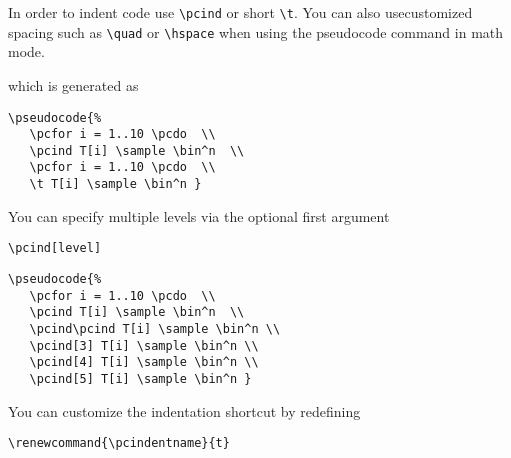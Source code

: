 \documentclass[a4paper]{report}
\begin{document}
In order to indent code use \lstinline$\pcind$ or short \lstinline$\t$. You can also usecustomized spacing such as \lstinline$\quad$ or \lstinline$\hspace$
when using the pseudocode command in math mode.
\begin{center}
\end{center}
which is generated as
\begin{lstlisting}
\pseudocode{%
   \pcfor i = 1..10 \pcdo  \\
   \pcind T[i] \sample \bin^n  \\
   \pcfor i = 1..10 \pcdo  \\
   \t T[i] \sample \bin^n }
\end{lstlisting}
You can specify multiple levels via the optional first argument
\begin{lstlisting}
\pcind[level]
\end{lstlisting}
\begin{center}
\end{center}
\begin{lstlisting}
\pseudocode{%
   \pcfor i = 1..10 \pcdo  \\
   \pcind T[i] \sample \bin^n  \\
   \pcind\pcind T[i] \sample \bin^n \\
   \pcind[3] T[i] \sample \bin^n \\
   \pcind[4] T[i] \sample \bin^n \\
   \pcind[5] T[i] \sample \bin^n }
\end{lstlisting}

You can customize the indentation shortcut by redefining
\begin{lstlisting}
\renewcommand{\pcindentname}{t}
\end{lstlisting}
\end{document}
